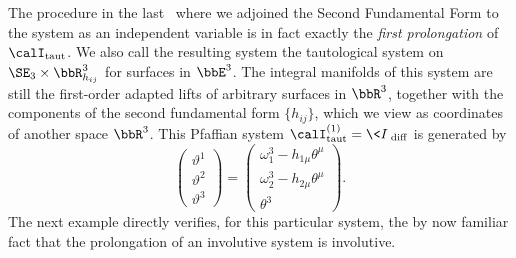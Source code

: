 The procedure in the last \sect\ where we adjoined the Second Fundamental Form to the system as an independent variable is in fact exactly the \emph{first prolongation} of $\calI_{\mathrm{taut}}$. We also call the resulting system the tautological system on $\SE_3\times\bbR^3_{h_{ij}}$ for surfaces in $\bbE^3$. The integral manifolds of this system are still the first-order adapted lifts of arbitrary surfaces in $\bbR^3$, together with the components of the second fundamental form $\{h_{ij}\}$, which we view as coordinates of another space $\bbR^3$. This Pfaffian system $\calI^{(1)}_{\mathrm{taut}}=\<I\>_{\mathrm{diff}}$ is generated by 
\[\begin{pmatrix}
    \vartheta^1\\
    \vartheta^2\\
    \vartheta^3
\end{pmatrix}=
\begin{pmatrix}
    \omega^3_1-h_{1\mu}\theta^\mu\\
    \omega^3_2-h_{2\mu}\theta^\mu\\
    \theta^3
\end{pmatrix}.\]
The next example directly verifies, for this particular system, the by now familiar fact that the prolongation of an involutive system is involutive. 

